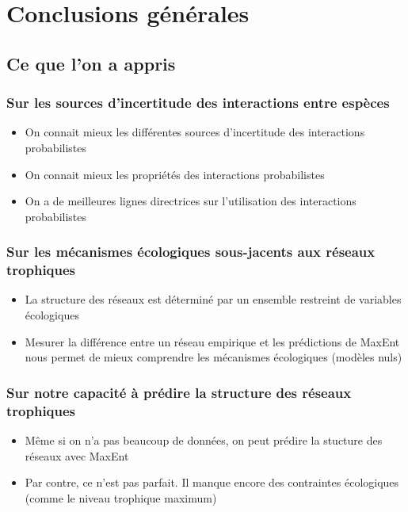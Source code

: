 
\francais   
\chapter*{Conclusions générales}

\section{Ce que l'on a appris}

\subsection{Sur les sources d'incertitude des interactions entre espèces} 

\begin{itemize}
    \item On connait mieux les différentes sources d'incertitude des interactions probabilistes 
    \item On connait mieux les propriétés des interactions probabilistes 
    \item On a de meilleures lignes directrices sur l'utilisation des interactions probabilistes
\end{itemize}

\subsection{Sur les mécanismes écologiques sous-jacents aux réseaux trophiques} 

\begin{itemize}
    \item La structure des réseaux est déterminé par un ensemble restreint de variables écologiques
    \item Mesurer la différence entre un réseau empirique et les prédictions de MaxEnt nous permet de mieux comprendre les mécanismes écologiques (modèles nuls)
\end{itemize}


\subsection{Sur notre capacité à prédire la structure des réseaux trophiques} 

\begin{itemize}
    \item Même si on n'a pas beaucoup de données, on peut prédire la stucture des réseaux avec MaxEnt
    \item Par contre, ce n'est pas parfait. Il manque encore des contraintes écologiques (comme le niveau trophique maximum)
\end{itemize}

